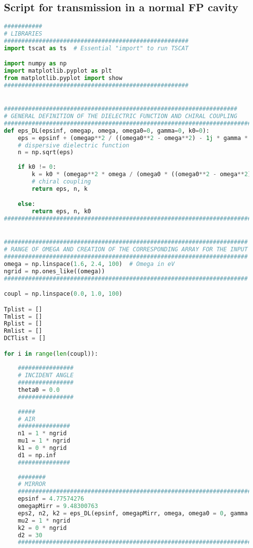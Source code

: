 \documentclass[aps,prl,10pt,onecolumn,superscriptaddress]{revtex4-2}
\begin{document}
\subsection{Script for transmission in a normal FP cavity}
\begin{lstlisting}[language=Python, caption=Script for Figure 10 $(a)$]
###########
# LIBRARIES
#####################################################
import tscat as ts  # Essential "import" to run TSCAT

import numpy as np
import matplotlib.pyplot as plt
from matplotlib.pyplot import show
#####################################################


###################################################################
# GENERAL DEFINITION OF THE DIELECTRIC FUNCTION AND CHIRAL COUPLING
###############################################################################################
def eps_DL(epsinf, omegap, omega, omega0=0, gamma=0, k0=0):
    eps = epsinf + (omegap**2 / ((omega0**2 - omega**2) - 1j * gamma * omega))  
    # dispersive dielectric function
    n = np.sqrt(eps)
    
    if k0 != 0:
        k = k0 * (omegap**2 * omega / (omega0 * ((omega0**2 - omega**2) - 1j * gamma * omega)))  
        # chiral coupling
        return eps, n, k

    else:
        return eps, n, k0
###############################################################################################


######################################################################
# RANGE OF OMEGA AND CREATION OF THE CORRESPONDING ARRAY FOR THE INPUT
######################################################################
omega = np.linspace(1.6, 2.4, 100)  # Omega in eV
ngrid = np.ones_like((omega))
######################################################################

coupl = np.linspace(0.0, 1.0, 100)

Tplist = []
Tmlist = []
Rplist = []
Rmlist = []
DCTlist = []

for i in range(len(coupl)):
 
    ################
    # INCIDENT ANGLE
    ################
    theta0 = 0.0
    ################
    
    #####
    # AIR
    ###############
    n1 = 1 * ngrid
    mu1 = 1 * ngrid
    k1 = 0 * ngrid
    d1 = np.inf
    ###############
    
    ########
    # MIRROR
    ########################################################################################
    epsinf = 4.77574276
    omegapMirr = 9.48300763
    eps2, n2, k2 = eps_DL(epsinf, omegapMirr, omega, omega0 = 0, gamma = 0.17486845, k0 = 0)
    mu2 = 1 * ngrid
    k2 = 0 * ngrid
    d2 = 30
    ########################################################################################   


\end{lstlisting}
\end{document}

